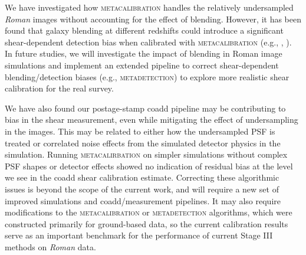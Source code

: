 \documentclass[fleqn,usenatbib]{mnras}
\begin{document}
We have investigated how \textsc{metacalibration} handles the relatively undersampled \emph{Roman} images without accounting for the effect of blending. However, it has been found that galaxy blending at different redshifts could introduce a significant shear-dependent detection bias when calibrated with \textsc{metacalibration} (e.g., \citealt{2020ApJ...902..138S}, \citealt{2020arXiv201208567M}). In future studies, we will investigate the impact of blending in Roman image simulations and implement an extended pipeline to correct shear-dependent blending/detection biases (e.g.,  \textsc{metadetection}) to explore more realistic shear calibration for the real survey. 

We have also found our postage-stamp coadd pipeline may be contributing to bias in the shear measurement, even while mitigating the effect of undersampling in the images.  This may be related to either how the undersampled PSF is treated or correlated noise effects from the simulated detector physics in the simulation. Running \textsc{metacalirbation} on simpler simulations without complex PSF shapes or detector effects showed no indication of residual bias at the level we see in the coadd shear calibration estimate. Correcting these algorithmic issues is beyond the scope of the current work, and will require a new set of improved simulations and coadd/measurement pipelines. It may also require modifications to the \textsc{metacalibration} or \textsc{metadetection} algorithms, which were constructed primarily for ground-based data, so the current calibration results serve as an important benchmark for the performance of current Stage III methods on \emph{Roman} data.
\end{document}
